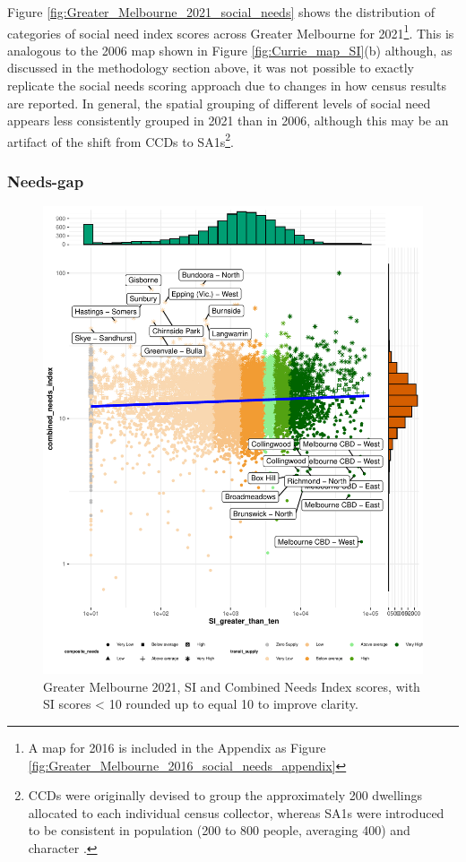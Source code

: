 \documentclass[preprint, 3p,
authoryear]{elsarticle} %
\begin{document}
Figure \ref{fig:Greater_Melbourne_2021_social_needs} shows the
distribution of categories of social need index scores across Greater
Melbourne for 2021\footnote{A map for 2016 is included in the Appendix
  as Figure \ref{fig:Greater_Melbourne_2016_social_needs_appendix}}.
This is analogous to the 2006 map shown in Figure
\ref{fig:Currie_map_SI}(b) although, as discussed in the methodology
section above, it was not possible to exactly replicate the
\citet{currie2010identifying} social needs scoring approach due to
changes in how census results are reported. In general, the spatial
grouping of different levels of social need appears less consistently
grouped in 2021 than in 2006, although this may be an artifact of the
shift from CCDs to SA1s\footnote{CCDs were originally devised to group
  the approximately 200 dwellings allocated to each individual census
  collector, whereas SA1s were introduced to be consistent in population
  (200 to 800 people, averaging 400) and character
  \citep{ABS_SA1s_CCDs}.}.

\subsubsection{Needs-gap}\label{needs-gap}

\begin{figure}
\centering
\includegraphics{ReynoldsCurrieQu2024_files/figure-latex/Greater_Melbourne_2021_needs_gap_scatterplot_figure-1.pdf}
\caption{Greater Melbourne 2021, SI and Combined Needs Index scores,
with SI scores \textless{} 10 rounded up to equal 10 to improve
clarity.}
\end{figure}
\end{document}
